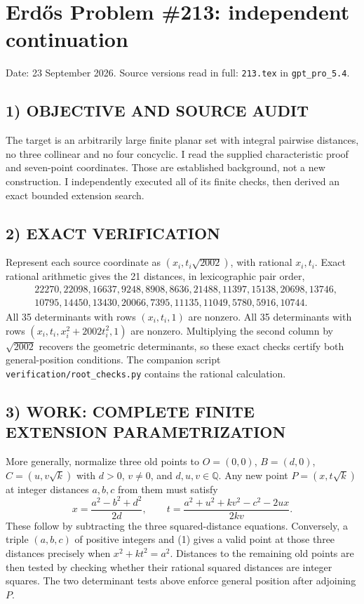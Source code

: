 \section{Erd\H{o}s Problem \#213: independent continuation}
\noindent Date: 23 September 2026. Source versions read in full: \texttt{213.tex} in \texttt{gpt\_pro\_5.4}.

\subsection*{1) OBJECTIVE AND SOURCE AUDIT}
The target is an arbitrarily large finite planar set with integral pairwise
distances, no three collinear and no four concyclic. I read the supplied
characteristic proof and seven-point coordinates. Those are established
background, not a new construction. I independently executed all of its
finite checks, then derived an exact bounded extension search.

\subsection*{2) EXACT VERIFICATION}
Represent each source coordinate as $(x_i,t_i\sqrt{2002})$, with rational
$x_i,t_i$. Exact rational arithmetic gives the 21 distances, in lexicographic
pair order,
\[
\begin{split}
&22270,22098,16637,9248,8908,8636,21488,11397,15138,20698,13746,\\
&10795,14450,13430,20066,7395,11135,11049,5780,5916,10744.
\end{split}
\]
All 35 determinants with rows $(x_i,t_i,1)$ are nonzero. All 35 determinants
with rows $(x_i,t_i,x_i^2+2002t_i^2,1)$ are nonzero. Multiplying the second
column by $\sqrt{2002}$ recovers the geometric determinants, so these exact
checks certify both general-position conditions. The companion script
\texttt{verification/root\_checks.py} contains the rational calculation.

\subsection*{3) WORK: COMPLETE FINITE EXTENSION PARAMETRIZATION}
More generally, normalize three old points to
$O=(0,0)$, $B=(d,0)$, $C=(u,v\sqrt k)$ with $d>0$, $v\ne0$, and
$d,u,v\in\mathbb Q$. Any new point $P=(x,t\sqrt k)$ at integer distances
$a,b,c$ from them must satisfy
\[
 x=\frac{a^2-b^2+d^2}{2d},\qquad
 t=\frac{a^2+u^2+kv^2-c^2-2ux}{2kv}. \tag{1}
\]
These follow by subtracting the three squared-distance equations.
Conversely, a triple $(a,b,c)$ of positive integers and (1) gives a valid
point at those three distances precisely when $x^2+kt^2=a^2$.
Distances to the remaining old points are then tested by checking whether
their rational squared distances are integer squares. The two determinant
tests above enforce general position after adjoining $P$.

